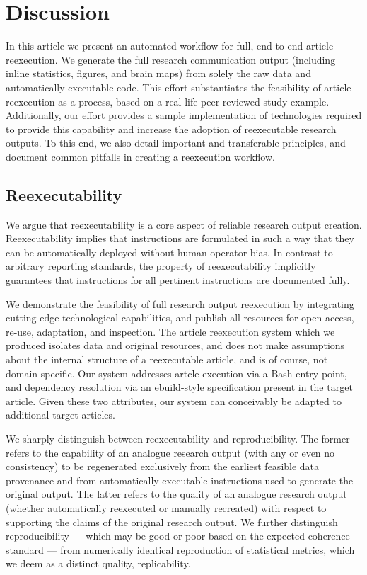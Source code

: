 \section{Discussion}

In this article we present an automated workflow for full, end-to-end article reexecution.
We generate the full research communication output (including inline statistics, figures, and brain maps) from solely the raw data and automatically executable code.
This effort substantiates the feasibility of article reexecution as a process, based on a real-life peer-reviewed study example.
Additionally, our effort provides a sample implementation of technologies required to provide this capability and increase the adoption of reexecutable research outputs.
To this end, we also detail important and transferable principles, and document common pitfalls in creating a reexecution workflow.

\subsection{Reexecutability}
We argue that reexecutability is a core aspect of reliable research output creation.
Reexecutability implies that instructions are formulated in such a way that they can be automatically deployed without human operator bias.
In contrast to arbitrary reporting standards, the property of reexecutability implicitly guarantees that instructions for all pertinent instructions are documented fully.

We demonstrate the feasibility of full research output reexecution by integrating cutting-edge technological capabilities, and publish all resources for open access, re-use, adaptation, and inspection.
The article reexecution system which we produced isolates data and original resources, and does not make assumptions about the internal structure of a reexecutable article, and is of course, not domain-specific.
Our system addresses artcle execution via a Bash entry point, and dependency resolution via an ebuild-style specification present in the target article.
Given these two attributes, our system can conceivably be adapted to additional target articles.

We sharply distinguish between reexecutability and reproducibility.
The former refers to the capability of an analogue research output (with any or even no consistency) to be regenerated exclusively from the earliest feasible data provenance and from automatically executable instructions used to generate the original output.
The latter refers to the quality of an analogue research output (whether automatically reexecuted or manually recreated) with respect to supporting the claims of the original research output.
We further distinguish reproducibility — which may be good or poor based on the expected coherence standard — from numerically identical reproduction of statistical metrics, which we deem as a distinct quality, replicability.

